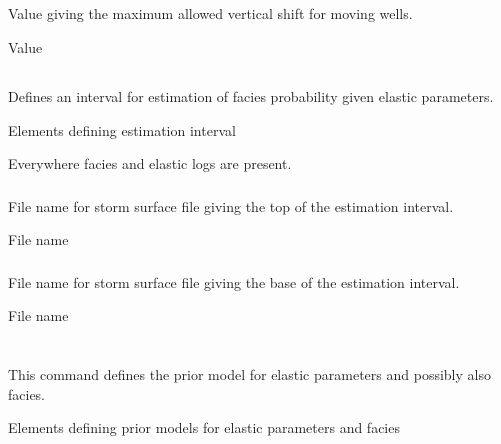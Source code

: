 \subsection{}
 \slist
   \item \Description Value giving the maximum allowed vertical shift for moving wells.
   \item \Argument Value
   \item {}
 \elist

\subsection{}
 \slist
   \item \Description Defines an interval for estimation of facies probability given elastic parameters.
   \item \Argument Elements defining estimation interval
   \item \Default Everywhere facies and elastic logs are present.
 \elist

\subsubsection{}
 \slist
   \item \Description File name for storm surface file giving the top of the estimation interval.
   \item \Argument File name
   \item \Default
 \elist

\subsubsection{}
 \slist
   \item \Description File name for storm surface file giving the base of the estimation interval.
   \item \Argument File name
   \item \Default
 \elist



\section{}
 \slist
   \item \Description This command defines the prior model for elastic parameters and possibly also facies.
   \item \Argument Elements defining prior models for elastic parameters and facies
   \item \Default
 \elist

